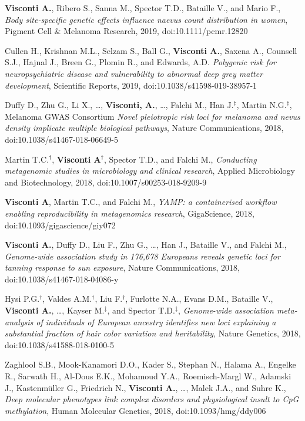\documentclass[a4paper,10pt]{article}
\begin{document}
{\begin{itemize}
		 \textbf{Visconti A.}, Ribero S., Sanna M., Spector T.D., Bataille V., and Mario F., \emph{Body site-specific genetic effects influence naevus count distribution in women}, Pigment Cell \& Melanoma Research, 2019, doi:10.1111/pcmr.12820
		
		 Cullen H., Krishnan M.L., Selzam S., Ball G., \textbf{Visconti A.}, Saxena A., Counsell S.J., Hajnal J., Breen G., Plomin R., and Edwards, A.D. \emph{Polygenic risk for neuropsychiatric disease and vulnerability to abnormal deep grey matter development}, Scientific Reports, 2019, doi:10.1038/s41598-019-38957-1
		
		 Duffy D., Zhu G., Li X., \dots, \textbf{Visconti, A.}, \dots, Falchi M., Han J.$^{\textbf{$\ddag $}}$, Martin N.G.$^{\textbf{$\ddag $}}$, Melanoma GWAS Consortium \emph{Novel pleiotropic risk loci for melanoma and nevus density implicate multiple biological pathways}, Nature Communications, 2018, doi:10.1038/s41467-018-06649-5
		
		 Martin T.C.$^{\textbf{$\dag $}}$, \textbf{Visconti A}$^{\textbf{$\dag $}}$, Spector T.D., and Falchi M., \emph{Conducting metagenomic studies in microbiology and clinical research}, Applied Microbiology and Biotechnology, 2018, doi:10.1007/s00253-018-9209-9

		 \textbf{Visconti A}, Martin T.C., and Falchi M., \emph{YAMP: a containerised workflow enabling reproducibility in metagenomics research}, GigaScience, 2018, doi:10.1093/gigascience/giy072
		
		 \textbf{Visconti A.}, Duffy D., Liu F., Zhu G., \dots, Han J., Bataille V., and Falchi M., \emph{Genome-wide association study in 176,678 Europeans reveals genetic loci for tanning response to sun exposure}, Nature Communications, 2018, doi:10.1038/s41467-018-04086-y
		
		 Hysi P.G.$^{\textbf{$\dag $}}$, Valdes A.M.$^{\textbf{$\dag $}}$, Liu F.$^{\textbf{$\dag $}}$, Furlotte N.A., Evans D.M., Bataille V., \textbf{Visconti A.}, \dots, Kayser M.$^{\textbf{$\ddag $}}$, and Spector T.D.$^{\textbf{$\ddag $}}$, \emph{Genome-wide association meta-analysis of individuals of European ancestry identifies new loci explaining a substantial fraction of hair color variation and heritability}, Nature Genetics, 2018, doi:10.1038/s41588-018-0100-5
		
		 Zaghlool S.B., Mook-Kanamori D.O., Kader S., Stephan N., Halama A., Engelke R., Sarwath H., Al-Dous E.K., Mohamoud Y.A., Roemisch-Margl W., Adamski J., Kastenmüller G., Friedrich N., \textbf{Visconti A.}, \dots, Malek J.A., and Suhre K., \emph{Deep molecular phenotypes link complex disorders and physiological insult to CpG methylation}, Human Molecular Genetics, 2018, doi:10.1093/hmg/ddy006
				

\end{itemize}}
\end{document}
